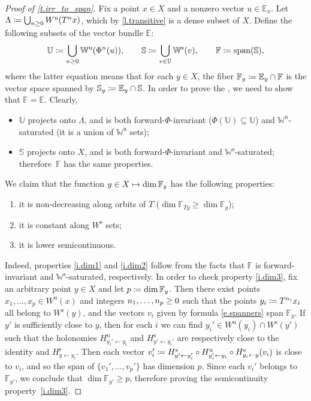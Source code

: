 \documentclass[10pt]{amsart}
\def\vcentcolon{\mathrel{\mathop\ordinarycolon}}
\providecommand\ordinarycolon{:}
\providecommand*\coloneqq{\vcentcolon\mathrel{\mkern-1.2mu}=}
\newcommand\mto{\mathchoice{\longmapsto}{\mapsto}{\mapsto}{\mapsto}}
\theoremstyle{plain}
\theoremstyle{definition}
\newcommand{\EE}{\mathbb{E}}
\newcommand{\FF}{\mathbb{F}}
\newcommand{\WW}{\mathbb{W}}
\newcommand{\uu}{\mathrm{u}}
\renewcommand{\ss}{\mathrm{s}}
\begin{document}
\begin{proof}[Proof of \cref{t.irr_to_span}]
Fix a point $x \in X$ and a nonzero vector $u \in \EE_x$.
Let $\Lambda \coloneqq \bigcup_{n \ge 0} W^\uu(T^n x)$, which by \cref{l.transitive} is a dense subset of $X$.
Define the following subsets of the vector bundle $\EE$:
\[
\mathbb{U} \coloneqq \bigcup_{n \ge 0} \WW^\uu(\Phi^n (u)),
\qquad
\mathbb{S} \coloneqq \bigcup_{v \in \mathbb{U}} \WW^\ss(v),
\qquad
\FF \coloneqq \mathrm{span}(\mathbb{S}),
\]
where the latter equation means that for each $y \in X$, the fiber $\FF_y \coloneqq \EE_y \cap \FF$ is the vector space spanned by $\mathbb{S}_y \coloneqq \EE_y \cap \mathbb{S}$.
In order to prove the , we need to show that $\FF = \EE$.
Clearly,
\begin{itemize}
\item $\mathbb{U}$ projects onto $\Lambda$, and is both forward-$\Phi$-invariant (\ie $\Phi(\mathbb{U}) \subseteq \mathbb{U}$) and $\WW^\uu$\nobreakdash-sat\-urated (\ie it is a union of $\WW^\uu$ sets);
\item $\mathbb{S}$ projects onto $X$, and is both forward-$\Phi$-invariant and $\WW^\ss$-saturated; therefore~$\FF$ has the same properties.
\end{itemize}

We claim that the function $y \in X \mto \dim \FF_y$ has the following properties:\enlargethispage{.5\baselineskip}%
\begin{enumerate}
\item\label{i.dim1}
it is non-decreasing along orbits of $T$ (\ie $\dim \FF_{Ty} \ge \dim \FF_y$);
\item\label{i.dim2}
it is constant along $W^\ss$ sets;
\item\label{i.dim3}
it is lower semicontinuous.
\end{enumerate}
Indeed, properties \eqref{i.dim1} and \eqref{i.dim2} follow from the facts that $\FF$ is forward-invariant and $\WW^\ss$-saturated, respectively.
In order to check property \eqref{i.dim3}, fix an arbitrary point \hbox{$y \in X$} and let $p \coloneqq \dim \FF_y$.
Then there exist points $x_1, \dots, x_p \in W^\uu(x)$ and integers $n_1, \dots, n_p \ge\nobreak 0$ such that the points $y_i \coloneqq T^{n_i} x_i$ all belong to $W^\ss(y)$, and the vectors $v_i$ given by formula \eqref{e.spanners} span $\FF_y$.
If $y'$ is sufficiently close to $y$, then for each $i$ we can find $y_i' \in W^\uu(y_i)\cap W^\ss(y')$ such that the holonomies $H^\uu_{y_i' \gets y_i}$ and $H^\ss_{y' \gets y_i'}$ are respectively close to the identity and $H^\ss_{y \gets y_i}$. Then each vector $v_i' \coloneqq H^\ss_{y' \gets y'_i} \circ H^\uu_{y'_i \gets y_i} \circ H^\ss_{y_i \gets y} (v_i)$ is close to $v_i$, and so the span of $\{v_1', \dots, v_p'\}$ has dimension $p$. Since each $v_i'$ belongs to~$\FF_{y'}$, we conclude that $\dim \FF_{y'} \ge p$, therefore proving the semicontinuity property~\eqref{i.dim3}.


\end{proof}
\end{document}
